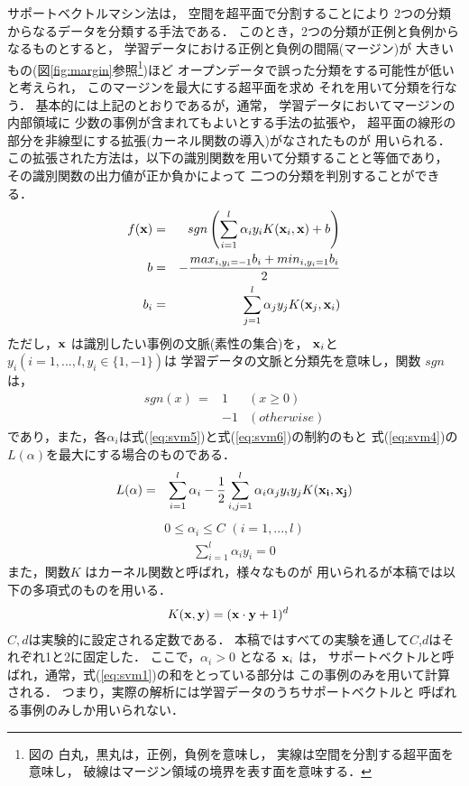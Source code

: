 サポートベクトルマシン法は，
空間を超平面で分割することにより
2つの分類からなるデータを分類する手法である．
このとき，2つの分類が正例と負例からなるものとすると，
学習データにおける正例と負例の間隔(マージン)が
大きいもの(図\ref{fig:margin}参照\footnote{図の
白丸，黒丸は，正例，負例を意味し，
実線は空間を分割する超平面を意味し，
破線はマージン領域の境界を表す面を意味する．})ほど
オープンデータで誤った分類をする可能性が低いと考えられ，
このマージンを最大にする超平面を求め
それを用いて分類を行なう．
基本的には上記のとおりであるが，通常，
学習データにおいてマージンの内部領域に
少数の事例が含まれてもよいとする手法の拡張や，
超平面の線形の部分を非線型にする拡張(カーネル関数の導入)がなされたものが
用いられる．
この拡張された方法は，以下の識別関数を用いて分類することと等価であり，
その識別関数の出力値が正か負かによって
二つの分類を判別することができる\cite{SVM,kudoh_svm}．
{
\begin{eqnarray}
  \label{eq:svm1}
  f({\bf x}) & = & sgn \left( \sum^{l}_{i=1} \alpha_i y_i K({\bf x}_i,{\bf x}) + b \right)\\
  b & = & -\frac{max_{i,y_i=-1}b_i + min_{i,y_i=1}b_i}{2}\nonumber\\
  b_i & = & \sum^l_{j=1} \alpha_j y_j K({\bf x}_j,{\bf x}_i) \nonumber
\end{eqnarray}
}
ただし，${\bf x}$ は識別したい事例の文脈(素性の集合)を，
${\bf x}_{i}$と$y_i(i=1,...,l, y_i\in\{1,-1\})$は
学習データの文脈と分類先を意味し，関数 $sgn$ は，
{
\begin{eqnarray}
  \label{eq:svm2}
  sgn(x) \, = & 1 & (x \geq 0)\\
          & -1 & (otherwise) \nonumber
\end{eqnarray}
}
であり，また，各$\alpha_i$は式(\ref{eq:svm5})と式(\ref{eq:svm6})の制約のもと
式(\ref{eq:svm4})の$L(\alpha )$を最大にする場合のものである．
{
\begin{eqnarray}
  \label{eq:svm4}
  L({\alpha}) & = & \sum^l_{i=1} \alpha_i - \frac{1}{2} \sum^l_{i,j=1} \alpha_i \alpha_j y_i y_j K({\bf x_i},{\bf x_j})
\end{eqnarray}
}
{
\begin{eqnarray}
  \label{eq:svm5}
  0 \leq \alpha_i \leq C \, \, (i=1,...,l)
\end{eqnarray}
}
{
\begin{eqnarray}
  \label{eq:svm6}
  \sum^l_{i=1} \alpha_i y_i = 0 
\end{eqnarray}
}
また，関数$K$ はカーネル関数と呼ばれ，様々なものが
用いられるが本稿では以下の多項式のものを用いる．
{
\begin{eqnarray}
  \label{eq:svm3}
  K({\bf x},{\bf y}) & = ({\bf x}\cdot{\bf y} + 1)^d
\end{eqnarray}
}
$C,d$は実験的に設定される定数である．
本稿ではすべての実験を通して$C$,$d$はそれぞれ1と2に固定した．
ここで，$\alpha_i > 0$ となる ${\bf x}_i$ は，
サポートベクトルと呼ばれ，通常，式(\ref{eq:svm1})の和をとっている部分は
この事例のみを用いて計算される．
つまり，実際の解析には学習データのうちサポートベクトルと
呼ばれる事例のみしか用いられない．

